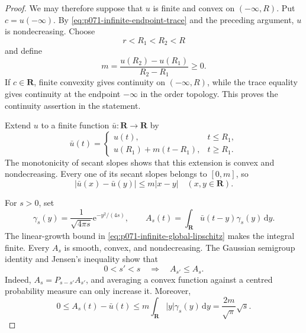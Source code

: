 \begin{proof}
We may therefore suppose that \(u\) is finite and convex on
\((-\infty,R)\).  Put \(c=u(-\infty)\).  By
\eqref{eq:p071-infinite-endpoint-trace} and the preceding argument, \(u\)
is nondecreasing.  Choose
\[
                       r<R_1<R_2<R
\]
and define
\[
              m=\frac{u(R_2)-u(R_1)}{R_2-R_1}\geq0.
\]
If \(c\in\mathbf R\), finite convexity gives continuity on
\((-\infty,R)\), while the trace equality gives continuity at the
endpoint \(-\infty\) in the order topology.  This proves the continuity
assertion in the statement.

Extend \(u\) to a finite function \(\bar u:\mathbf R\to\mathbf R\) by
\begin{equation}
 \bar u(t)=
 \begin{cases}
     u(t),&t\leq R_1,\\
     u(R_1)+m(t-R_1),&t\geq R_1.
 \end{cases}
 \label{eq:p071-infinite-convex-extension}
\end{equation}
The monotonicity of secant slopes shows that this extension is convex and
nondecreasing.  Every one of its secant slopes belongs to \([0,m]\), so
\begin{equation}
              |\bar u(x)-\bar u(y)|\leq m|x-y|
                    \quad(x,y\in\mathbf R).
 \label{eq:p071-infinite-global-lipschitz}
\end{equation}

For \(s>0\), set
\begin{equation}
 \gamma_s(y)=\frac{1}{\sqrt{4\pi s}}
       \mathrm e^{-y^2/(4s)},
 \qquad
 A_s(t)=\int_{\mathbf R}\bar u(t-y)\gamma_s(y)\,\mathrm dy.
 \label{eq:p071-infinite-heat-regularization}
\end{equation}
The linear-growth bound in
\eqref{eq:p071-infinite-global-lipschitz} makes the integral finite.
Every \(A_s\) is smooth, convex, and nondecreasing.  The Gaussian
semigroup identity and Jensen's inequality show that
\begin{equation}
             0<s'<s\quad\Longrightarrow\quad A_{s'}\leq A_s.
 \label{eq:p071-infinite-heat-monotonicity}
\end{equation}
Indeed, \(A_s=P_{s-s'}A_{s'}\), and averaging a convex function against
a centred probability measure can only increase it.  Moreover,
\begin{equation}
 0\leq A_s(t)-\bar u(t)
 \leq m\int_{\mathbf R}|y|\gamma_s(y)\,\mathrm dy
 =\frac{2m}{\sqrt{\pi}}\sqrt{s}.
 \label{eq:p071-infinite-heat-error}
\end{equation}


\end{proof}
